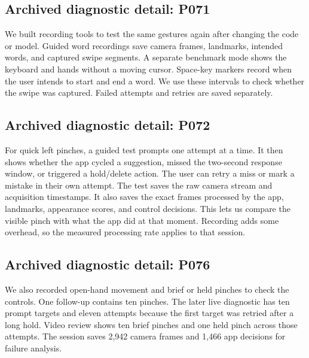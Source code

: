 

\subsection*{Archived diagnostic detail: P071}
We built recording tools to test the same gestures again after changing the code or model. Guided word recordings save camera frames, landmarks, intended words, and captured swipe segments. A separate benchmark mode shows the keyboard and hands without a moving cursor. Space-key markers record when the user intends to start and end a word. We use these intervals to check whether the swipe was captured. Failed attempts and retries are saved separately.

\subsection*{Archived diagnostic detail: P072}
For quick left pinches, a guided test prompts one attempt at a time. It then shows whether the app cycled a suggestion, missed the two-second response window, or triggered a hold/delete action. The user can retry a miss or mark a mistake in their own attempt. The test saves the raw camera stream and acquisition timestamps. It also saves the exact frames processed by the app, landmarks, appearance scores, and control decisions. This lets us compare the visible pinch with what the app did at that moment. Recording adds some overhead, so the measured processing rate applies to that session.

\subsection*{Archived diagnostic detail: P076}
We also recorded open-hand movement and brief or held pinches to check the controls. One follow-up contains ten pinches. The later live diagnostic has ten prompt targets and eleven attempts because the first target was retried after a long hold. Video review shows ten brief pinches and one held pinch across those attempts. The session saves 2,942 camera frames and 1,466 app decisions for failure analysis.

